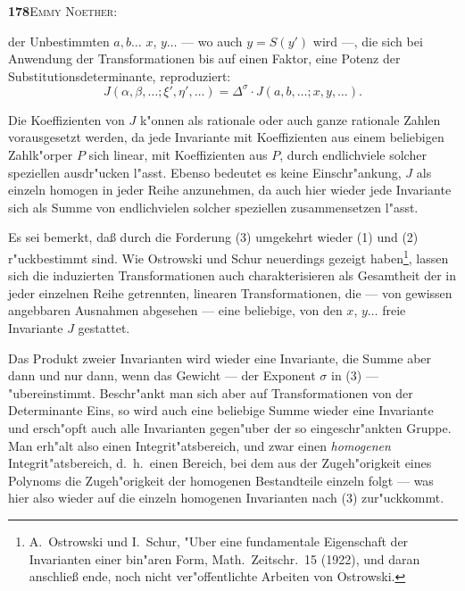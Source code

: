 \documentclass[12pt,a4paper]{article}
\begin{document}
\renewenvironment{noetherpaper}[4]{\newpage\section*{#1}\addcontentsline{toc}{section}{#1}\par\smallskip}{\par\medskip}

\setlength{\parindent}{0pt}
\setlength{\parskip}{0.3em}

\thispagestyle{empty}
\begin{center}
\textbf{178}\quad\textsc{Emmy Noether:}
\end{center}

\vspace{-0.5em}
der Unbestimmten $a,b\dots$ $x$, $y\dots$ --- wo auch $y=S(y')$ wird ---, die
sich bei Anwendung der Transformationen bis auf einen Faktor, eine
Potenz der Substitutionsdeterminante, reproduziert:
\begin{equation}\tag{3}
J(\alpha,\beta,\dots; \xi',\eta',\dots)=\Delta^{\sigma}\cdot J(a,b,\dots; x,y,\dots).
\end{equation}

Die Koeffizienten von $J$ k"{o}nnen als rationale oder auch ganze rationale
Zahlen vorausgesetzt werden, da jede Invariante mit Koeffizienten aus
einem beliebigen Zahlk"{o}rper $P$ sich linear, mit Koeffizienten aus $P$, durch
endlichviele solcher speziellen ausdr"{u}cken l"{a}sst. Ebenso bedeutet es keine
Einschr"{a}nkung, $J$ als einzeln homogen in jeder Reihe anzunehmen, da
auch hier wieder jede Invariante sich als Summe von endlichvielen
solcher speziellen zusammensetzen l"{a}sst.

Es sei bemerkt, da{\ss} durch die Forderung (3) umgekehrt wieder
(1) und (2) r"{u}ckbestimmt sind. Wie Ostrowski und Schur neuerdings
gezeigt haben\footnote{A.~Ostrowski und I.~Schur, "{U}ber eine fundamentale Eigenschaft der
Invarianten einer bin"{a}ren Form, Math.~Zeitschr.\ 15 (1922), und daran anschlie{\ss} ende,
noch nicht ver"{o}ffentlichte Arbeiten von Ostrowski.}, lassen sich die induzierten Transformationen auch
charakterisieren als Gesamtheit der in jeder einzelnen Reihe getrennten,
linearen Transformationen, die --- von gewissen angebbaren Ausnahmen
abgesehen --- eine beliebige, von den $x$, $y\dots$ freie Invariante $J$
gestattet.

Das Produkt zweier Invarianten wird wieder eine Invariante, die
Summe aber dann und nur dann, wenn das Gewicht --- der Exponent $\sigma$
in (3) --- "{u}bereinstimmt. Beschr"{a}nkt man sich aber auf Transformationen
von der Determinante Eins, so wird auch eine beliebige Summe wieder
eine Invariante und ersch"{o}pft auch alle Invarianten gegen"{u}ber der so
eingeschr"{a}nkten Gruppe. Man erh"{a}lt also einen Integrit"{a}tsbereich, und
zwar einen \textit{homogenen} Integrit"{a}tsbereich, d.~h.~einen Bereich, bei dem aus
der Zugeh"{o}rigkeit eines Polynoms die Zugeh"{o}rigkeit der homogenen
Bestandteile einzeln folgt --- was hier also wieder auf die einzeln homogenen
Invarianten nach (3) zur"{u}ckkommt.
\end{document}
